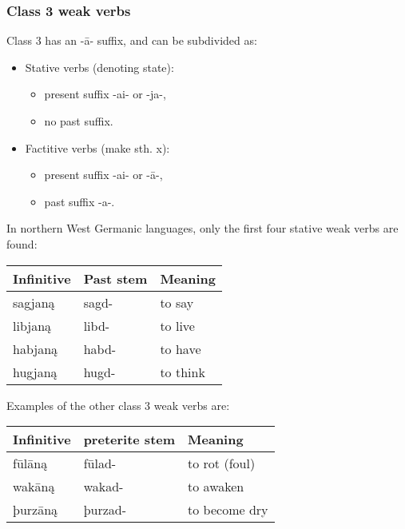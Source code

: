\documentclass{article}
\begin{document}
\subsubsection{Class 3 weak verbs}

Class 3 has an -ā- suffix, and can be subdivided as:

\begin{itemize}
\item Stative verbs (denoting state):
    \begin{itemize}
    \item present suffix -ai- or -ja-,
    \item no past suffix.
    \end{itemize}
\item Factitive verbs (make sth. x):
    \begin{itemize}
    \item present suffix -ai- or -ā-,
    \item past suffix -a-.
    \end{itemize}
\end{itemize}

In northern West Germanic languages, only the first four stative weak verbs are found:

\begin{center}
\begin{tabular}{| l l l |}
\hline
Infinitive & Past stem & Meaning \\
\hline
sagjaną & sagd- & to say \\
libjaną & libd- & to live \\
habjaną & habd- & to have \\
hugjaną & hugd- & to think \\
\hline
\end{tabular}
\end{center}

Examples of the other class 3 weak verbs are:

\begin{center}
\begin{tabular}{| l l l |}
\hline
Infinitive & preterite stem & Meaning \\
\hline
fūlāną  & fūlad-  & to rot (foul) \\
wakāną  & wakad-  & to awaken \\
þurzāną & þurzad- & to become dry \\
\hline
\end{tabular}
\end{center}
\end{document}
